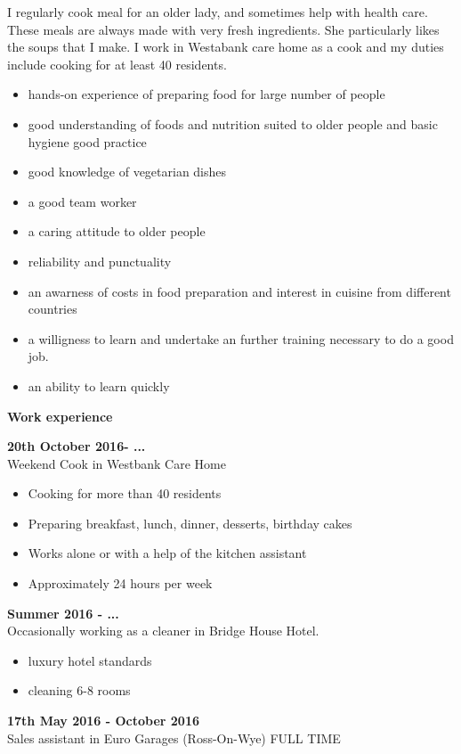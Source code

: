 \documentclass[a4paper,12pt,final]{memoir}
\newcommand{\SmallSep}{\vspace{0.5em}}
\newenvironment{Career Profile}
	{\ignorespaces\textbf{\color{ForestGreen} Career Profile}}
	{\Sep\ignorespacesafterend}
\newenvironment{Key experience}
	{\ignorespaces\textbf{\color{ForestGreen} Key experience}}
	{\Sep\ignorespacesafterend}
\newcommand{\CVSection}[1]
	{\Large\textbf{#1}\par
	\SmallSep\normalsize\normalfont}
\newcommand{\CVItem}[1]
	{\textbf{\color{ForestGreen} #1}}
\begin{document}
\begin{Key experience}
I regularly cook meal for an older lady, and sometimes help with health care. These meals are always made with very fresh ingredients. She particularly likes the soups that I make. I work in Westabank care home as a cook and my duties include cooking for at least 40 residents. 
\begin{itemize}
\item hands-on experience of preparing food for large number of people
\item good understanding of foods and nutrition suited to older people and basic hygiene good practice
\item good knowledge of vegetarian dishes
\item a good team worker
\item a caring attitude to older people
\item reliability and punctuality
\item an awarness of costs in food preparation and interest in cuisine from different countries
\item a willigness to learn and undertake an further training necessary to do a good job.
\item an ability to learn quickly
\end{itemize}
\end{Key experience}

\CVSection{Work experience}

\CVItem{20th October 2016- ...}\\
Weekend Cook in Westbank Care Home \\
\begin{itemize}
\item{Cooking for more than 40 residents}
\item{Preparing breakfast, lunch, dinner, desserts, birthday cakes}
\item{Works alone or with a help of the kitchen assistant}
\item{Approximately 24 hours per week}
\end{itemize}

\CVItem{Summer 2016 - ...}\\
Occasionally working as a cleaner in Bridge House Hotel.
\begin{itemize}
\item{luxury hotel standards}
\item{cleaning 6-8 rooms}
\end{itemize}
\clearpage
\framebreak
\framebreak
\CVItem{17th May 2016 - October 2016}\\
Sales assistant in Euro Garages (Ross-On-Wye) FULL TIME
\SmallSep
\end{document}
